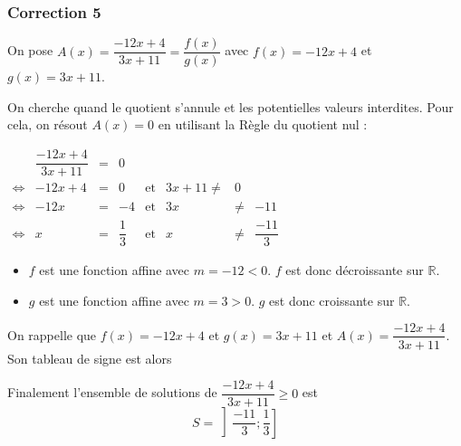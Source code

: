 \documentclass[15pt, mathserif]{beamer}
\begin{document}
\begin{frame}
\vspace{-10mm}
	\frametitle{Correction 5}
\vspace*{1cm} 
  On pose $A(x) = \dfrac{-12x+4}{3x+11} = \dfrac{f(x)}{g(x)}$ avec $f(x) = -12x+4$ et $g(x) = 3x+11$.

 On cherche quand le quotient s'annule et les potentielles valeurs interdites. Pour cela, on résout $A(x)=0$ en utilisant la Règle du quotient nul : 
 
 $\begin{array}{crclcrcl} 
 
 	  & \dfrac{-12x+4}{3x+11} & = & 0 \\ 
 	  \Leftrightarrow & -12x+4 & =& 0 & \text{et} & 3x+11\neq & 0 \\ 
 	 \Leftrightarrow & -12x&=&-4& \text{et} & 3x & \neq & -11 \\ 
 	 \Leftrightarrow & x&=&\dfrac{1}{3} & \text{et} & x &\neq&\dfrac{-11}{3}
 
 \end{array}$ 
 	 \begin{itemize} 
	\item  $f$ est une fonction affine avec $m =-12<0$. $f$ est donc décroissante sur $\mathbb{R}$.
	\item $g$ est une fonction affine avec $m =3>0$. $g$ est donc croissante sur $\mathbb{R}$.

	 \end{itemize}

 \end{frame}


\begin{frame}On rappelle que $f(x) = -12x+4$ et $g(x) = 3x+11$ et $A(x) = \dfrac{-12x+4}{3x+11}$. Son tableau de signe est alors 

\medskip \hfil
{}

 Finalement l'ensemble de solutions de $\dfrac{-12x+4}{3x+11}\geq0$ est\[S = \left]\dfrac{-11}{3};\dfrac{1}{3}\right]\]

\end{frame}
\end{document}
